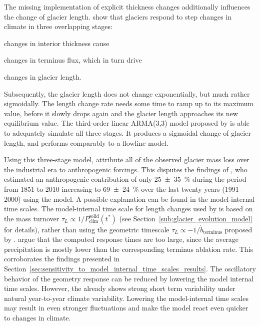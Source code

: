         The missing implementation of explicit thickness changes additionally influences the change of glacier length. \citet{Roe2014} show that glaciers respond to step changes in climate in three overlapping stages:
        \begin{enumerate*}[label=(\arabic*)]
            \item changes in interior thickness cause
            \item changes in terminus flux, which in turn drive
            \item changes in glacier length.
        \end{enumerate*}
        Subsequently, the glacier length does not change exponentially, but much rather sigmoidally. The length change rate needs some time to ramp up to its maximum value, before it slowly drops again and the glacier length approaches its new equilibrium value. The third-order linear ARMA(3,3) model proposed by \citet{Roe2014} is able to adequately simulate all three stages. It produces a sigmoidal change of glacier length, and performs comparably to a flowline model.

        Using this three-stage model, \citet{Roe2020} attribute all of the observed glacier mass loss over the industrial era to anthropogenic forcings. This disputes the findings of \citet{Marzeion2014a}, who estimated an anthropogenic contribution of only 25\SI{\pm35}{\percent} during the period from 1851 to 2010 increasing to 69\SI{\pm24}{\percent} over the last twenty years (1991--2000) using the \vas{} model. A possible explanation can be found in the model-internal time scales. The model-internal time scale for length changes used by \citet{Marzeion2012b} is based on the mass turnover $\tau_L \propto 1/P^\text{solid}_\text{clim}(t^*)$ (see Section~\ref{sub:glacier_evolution_model} for details), rather than using the geometric timescale $\tau_L \propto -1/\dot{b}_\text{terminus}$ proposed by \citet{Johannesson1989}. \citet{Roe2020} argue that the computed response times are too large, since the average precipitation is mostly lower than the corresponding terminus ablation rate. This corroborates the findings presented in Section~\ref{sec:sensitivity_to_model_internal_time_scales_results}. The oscillatory behavior of the geometry response can be reduced by lowering the model internal time scales. However, the \vas{} already shows strong short term variability under natural year-to-year climate variability. Lowering the model-internal time scales may result in even stronger fluctuations and make the model react even quicker to changes in climate.


